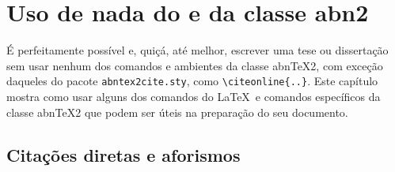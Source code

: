 

 
\chapter{Uso de nada do \protect{\LaTeX} e da classe abn\protect{\TeX}2}
\label{cap_exemplos}



É perfeitamente possível e, quiçá, até melhor, escrever uma 
tese ou dissertação sem usar nenhum dos comandos e ambientes 
da classe {abn\TeX{}2}, com exceção daqueles do pacote 
\texttt{abntex2cite.sty}, como \verb|\citeonline{..}|. 
Este capítulo mostra como usar alguns dos comandos do \LaTeX\ e 
comandos específicos da classe {abn\TeX{}2} que podem ser úteis na
preparação do seu documento. 

\section{Citações diretas e aforismos}

